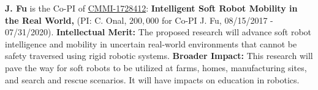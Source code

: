 \documentclass[letterpaper, 11 pt, onecolumn]{article}
\begin{document}
\textbf{J. Fu} is the Co-PI of
\underline{CMMI-1728412}: \textbf{Intelligent Soft Robot Mobility in
  the Real World,} (PI: C. Onal, $200,000$ for Co-PI J. Fu, 08/15/2017
- 07/31/2020). \textbf{Intellectual Merit:} The proposed research will
advance soft robot intelligence and mobility in uncertain real-world
environments that cannot be safety traversed using rigid robotic
systems.  \textbf{Broader Impact:} This research will pave the way for
soft robots to be utilized at farms, homes, manufacturing sites, and
search and rescue scenarios. It will have impacts on education in
robotics.



\pagebreak
\setcounter{page}{1}
\setcounter{section}{0}

\pagebreak
\setcounter{section}{0}

\pagebreak
\setcounter{section}{0}

\pagebreak
\setcounter{section}{0}


\pagebreak
\setcounter{page}{1}


\end{document}
